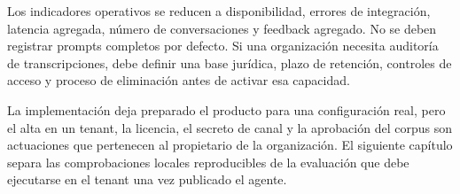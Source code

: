 Los indicadores operativos se reducen a disponibilidad, errores de integraci\'on, latencia agregada, n\'umero de conversaciones y feedback agregado. No se deben registrar prompts completos por defecto. Si una organizaci\'on necesita auditor\'ia de transcripciones, debe definir una base jur\'idica, plazo de retenci\'on, controles de acceso y proceso de eliminaci\'on antes de activar esa capacidad.

La implementaci\'on deja preparado el producto para una configuraci\'on real, pero el alta en un tenant, la licencia, el secreto de canal y la aprobaci\'on del corpus son actuaciones que pertenecen al propietario de la organizaci\'on. El siguiente cap\'itulo separa las comprobaciones locales reproducibles de la evaluaci\'on que debe ejecutarse en el tenant una vez publicado el agente.
